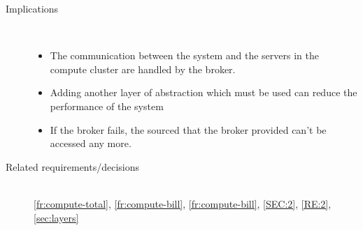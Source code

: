 \begin{description}
\item [Implications]~

\begin{itemize}
\item The communication between the system and the servers in the compute cluster are handled by the broker. 
\item Adding another layer of abstraction which must be used can reduce the performance of the system
\item If the broker fails, the sourced that the broker provided can't be accessed any more.
\end{itemize}

\item [Related requirements/decisions]~\\
\ref{fr:compute-total}, \ref{fr:compute-bill}, \ref{fr:compute-bill}, \ref{SEC:2}, \ref{RE:2}, \ref{sec:layers}
\end{description}

